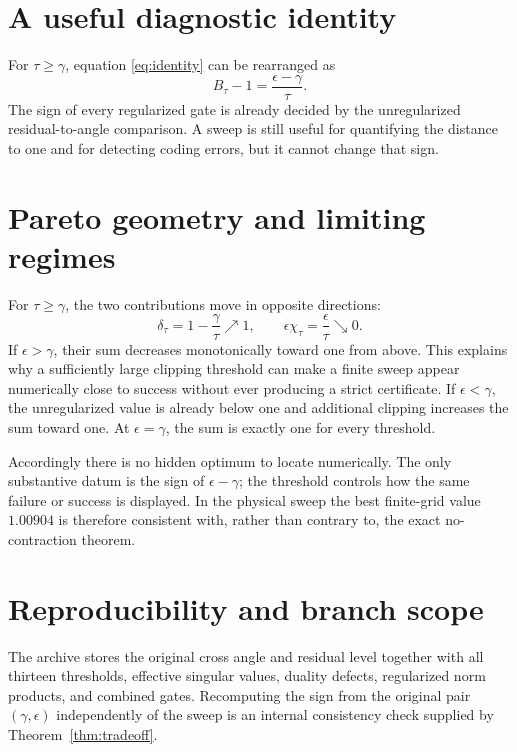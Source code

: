 \documentclass[12pt]{article}
\theoremstyle{remark}
\begin{document}
\section{A useful diagnostic identity}

For $\tau\ge\gamma$, equation \eqref{eq:identity} can be rearranged as
\begin{equation}\label{eq:diagnostic}
 B_\tau-1=\frac{\epsilon-\gamma}{\tau}.
\end{equation}
The sign of every regularized gate is already decided by the unregularized
residual-to-angle comparison.  A sweep is still useful for quantifying the
distance to one and for detecting coding errors, but it cannot change that
sign.

\section{Pareto geometry and limiting regimes}

For $\tau\ge\gamma$, the two contributions move in opposite directions:
\begin{equation}\label{eq:pareto-components}
 \delta_\tau=1-\frac\gamma\tau\nearrow1,
 \qquad
 \epsilon\chi_\tau=\frac\epsilon\tau\searrow0.
\end{equation}
If $\epsilon>\gamma$, their sum decreases monotonically toward one from
above.  This explains why a sufficiently large clipping threshold can make
a finite sweep appear numerically close to success without ever producing a
strict certificate.  If $\epsilon<\gamma$, the unregularized value is
already below one and additional clipping increases the sum toward one.  At
$\epsilon=\gamma$, the sum is exactly one for every threshold.

Accordingly there is no hidden optimum to locate numerically.  The only
substantive datum is the sign of $\epsilon-\gamma$; the threshold controls
how the same failure or success is displayed.  In the physical sweep the
best finite-grid value $1.00904$ is therefore consistent with, rather than
contrary to, the exact no-contraction theorem.

\section{Reproducibility and branch scope}

The archive stores the original cross angle and residual level together
with all thirteen thresholds, effective singular values, duality defects,
regularized norm products, and combined gates.  Recomputing the sign from
the original pair $(\gamma,\epsilon)$ independently of the sweep is an
internal consistency check supplied by Theorem~\ref{thm:tradeoff}.
\end{document}

